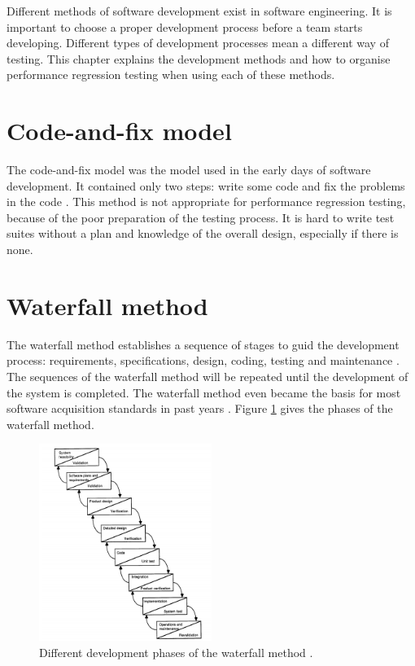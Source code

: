 Different methods of software development exist in software engineering. It is important to choose a proper development process before a team starts developing. Different types of development processes mean a different way of testing. This chapter explains the development methods and how to organise performance regression testing when using each of these methods.

\section{Code-and-fix model}
The code-and-fix model was the model used in the early days of software development. It contained only two steps: write some code and fix the problems in the code \cite{boehm1988spiral}. This method is not appropriate for performance regression testing, because of the poor preparation of the testing process. It is hard to write test suites without a plan and knowledge of the overall design, especially if there is none.

\section{Waterfall method}
The waterfall method establishes a sequence of stages to guid the development process: requirements, specifications, design, coding, testing and maintenance \cite{kang1989software}. The sequences of the waterfall method will be repeated until the development of the system is completed. The waterfall method even became the basis for most software acquisition standards in past years \cite{boehm1988spiral}. Figure \ref{Figure:Waterfall} gives the phases of the waterfall method.

\begin{figure}[H]
\label{Figure:Waterfall}
\begin{center}
  \includegraphics[width=0.5\textwidth]{Figures/waterfall.jpg}
\end{center}
  \caption{Different development phases of the waterfall method \cite{boehm1988spiral}.} 
\end{figure}

